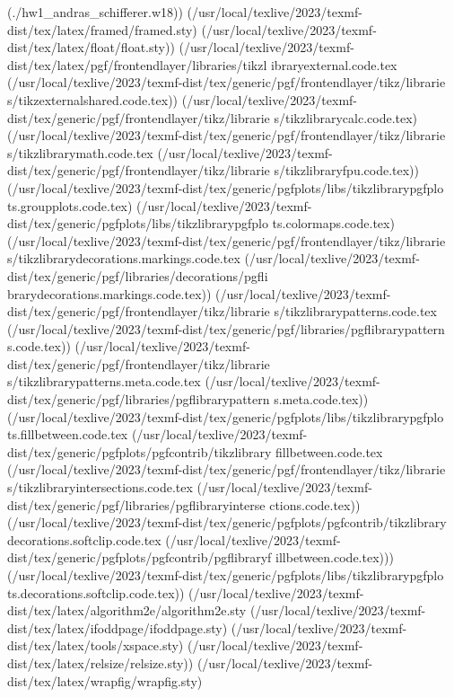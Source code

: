 (./hw1_andras_schifferer.w18))
(/usr/local/texlive/2023/texmf-dist/tex/latex/framed/framed.sty)
(/usr/local/texlive/2023/texmf-dist/tex/latex/float/float.sty))
(/usr/local/texlive/2023/texmf-dist/tex/latex/pgf/frontendlayer/libraries/tikzl
ibraryexternal.code.tex
(/usr/local/texlive/2023/texmf-dist/tex/generic/pgf/frontendlayer/tikz/librarie
s/tikzexternalshared.code.tex))
(/usr/local/texlive/2023/texmf-dist/tex/generic/pgf/frontendlayer/tikz/librarie
s/tikzlibrarycalc.code.tex)
(/usr/local/texlive/2023/texmf-dist/tex/generic/pgf/frontendlayer/tikz/librarie
s/tikzlibrarymath.code.tex
(/usr/local/texlive/2023/texmf-dist/tex/generic/pgf/frontendlayer/tikz/librarie
s/tikzlibraryfpu.code.tex))
(/usr/local/texlive/2023/texmf-dist/tex/generic/pgfplots/libs/tikzlibrarypgfplo
ts.groupplots.code.tex)
(/usr/local/texlive/2023/texmf-dist/tex/generic/pgfplots/libs/tikzlibrarypgfplo
ts.colormaps.code.tex)
(/usr/local/texlive/2023/texmf-dist/tex/generic/pgf/frontendlayer/tikz/librarie
s/tikzlibrarydecorations.markings.code.tex
(/usr/local/texlive/2023/texmf-dist/tex/generic/pgf/libraries/decorations/pgfli
brarydecorations.markings.code.tex))
(/usr/local/texlive/2023/texmf-dist/tex/generic/pgf/frontendlayer/tikz/librarie
s/tikzlibrarypatterns.code.tex
(/usr/local/texlive/2023/texmf-dist/tex/generic/pgf/libraries/pgflibrarypattern
s.code.tex))
(/usr/local/texlive/2023/texmf-dist/tex/generic/pgf/frontendlayer/tikz/librarie
s/tikzlibrarypatterns.meta.code.tex
(/usr/local/texlive/2023/texmf-dist/tex/generic/pgf/libraries/pgflibrarypattern
s.meta.code.tex))
(/usr/local/texlive/2023/texmf-dist/tex/generic/pgfplots/libs/tikzlibrarypgfplo
ts.fillbetween.code.tex
(/usr/local/texlive/2023/texmf-dist/tex/generic/pgfplots/pgfcontrib/tikzlibrary
fillbetween.code.tex
(/usr/local/texlive/2023/texmf-dist/tex/generic/pgf/frontendlayer/tikz/librarie
s/tikzlibraryintersections.code.tex
(/usr/local/texlive/2023/texmf-dist/tex/generic/pgf/libraries/pgflibraryinterse
ctions.code.tex))
(/usr/local/texlive/2023/texmf-dist/tex/generic/pgfplots/pgfcontrib/tikzlibrary
decorations.softclip.code.tex
(/usr/local/texlive/2023/texmf-dist/tex/generic/pgfplots/pgfcontrib/pgflibraryf
illbetween.code.tex)))
(/usr/local/texlive/2023/texmf-dist/tex/generic/pgfplots/libs/tikzlibrarypgfplo
ts.decorations.softclip.code.tex))
(/usr/local/texlive/2023/texmf-dist/tex/latex/algorithm2e/algorithm2e.sty
(/usr/local/texlive/2023/texmf-dist/tex/latex/ifoddpage/ifoddpage.sty)
(/usr/local/texlive/2023/texmf-dist/tex/latex/tools/xspace.sty)
(/usr/local/texlive/2023/texmf-dist/tex/latex/relsize/relsize.sty))
(/usr/local/texlive/2023/texmf-dist/tex/latex/wrapfig/wrapfig.sty)
